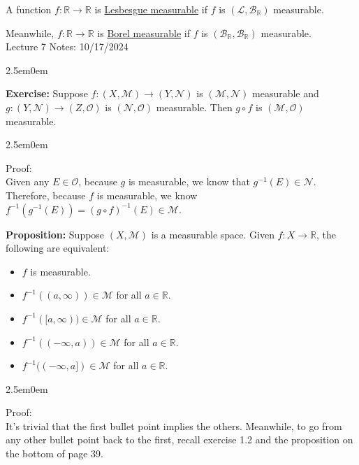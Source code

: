 \documentclass{book}
\newcommand{\hTwo}{%
\color{MidnightBlue}%
   \fontsize{13}{15}\selectfont%
}
\newcommand{\hThree}{%
   \color{PineGreen!85!Orange}
   \fontsize{12}{14}\selectfont%
}
\newcommand{\exTwo}{%
   \color{Purple}%
   \fontsize{13}{15}\selectfont%
}
\newcommand{\exPP}{%
   \color{RedViolet}%
   \fontsize{12}{14}\selectfont%
}
\newenvironment{myIndent}{%
   \begin{adjustwidth}{2.5em}{0em}%
}{%
   \end{adjustwidth}%
}
\newcommand{\udefine}[1]{{%
   \setulcolor{Red}%
   \setul{0.14em}{0.07em}%
   \ul{#1}%
}}
\newcommand{\blab}[1]{\textbf{#1}}
\newcommand{\retTwo}{\hfill\bigbreak}
\newcommand{\mHeader}[1]{{
   \color{Black}%
   \fontsize{20}{18}\selectfont%
   #1\retTwo
}}
\begin{document}
A function $f: \mathbb{R} \longrightarrow \mathbb{R}$ is \udefine{Lesbesgue measurable} if $f$ is $(\mathcal{L}, \mathcal{B}_\mathbb{R})$ measurable.\retTwo

Meanwhile, $f: \mathbb{R} \longrightarrow \mathbb{R}$ is \udefine{Borel measurable} if $f$ is $(\mathcal{B}_{\mathbb{R}}, \mathcal{B}_\mathbb{R})$ measurable.\\[6pt]

\mHeader{Lecture 7 Notes: 10/17/2024}

\begin{myIndent}\exTwo
   \blab{Exercise:} Suppose $f: (X, \mathcal{M}) \longrightarrow (Y, \mathcal{N})$ is $(\mathcal{M}, \mathcal{N})$ measurable and\\ $g: (Y, \mathcal{N}) \longrightarrow (Z, \mathcal{O})$ is $(\mathcal{N}, \mathcal{O})$ measurable. Then $g \circ f$ is $(\mathcal{M}, \mathcal{O})$ measurable.

   \begin{myIndent}
      \exPP Proof:\\
      Given any $E \in \mathcal{O}$, because $g$ is measurable, we know that $g^{-1}(E) \in \mathcal{N}$. Therefore, because $f$ is measurable, we know $f^{-1}(g^{-1}(E)) = (g \circ f)^{-1}(E) \in \mathcal{M}$.\retTwo
   \end{myIndent}

   \hTwo\blab{Proposition:} Suppose $(X, \mathcal{M})$ is a measurable space. Given $f: X \longrightarrow \mathbb{R}$, the following are equivalent:
   \begin{itemize}
      \item $f$ is measurable.
      \item $f^{-1}((a, \infty)) \in \mathcal{M}$ for all $a \in \mathbb{R}$.
      \item $f^{-1}([a, \infty)) \in \mathcal{M}$ for all $a \in \mathbb{R}$.
      \item $f^{-1}((-\infty, a)) \in \mathcal{M}$ for all $a \in \mathbb{R}$.
      \item $f^{-1}((-\infty, a]) \in \mathcal{M}$ for all $a \in \mathbb{R}$.\retTwo
   \end{itemize}

   \begin{myIndent}\hThree
      Proof:\\
      It's trivial that the first bullet point implies the others. Meanwhile, to go from any other bullet point back to the first, recall exercise 1.2 and the proposition on the bottom of page 39.\retTwo
   \end{myIndent}\retTwo
\end{myIndent}
\end{document}
